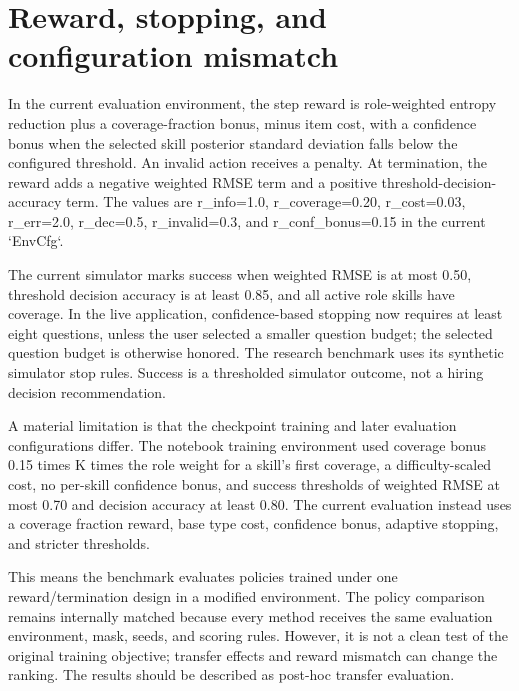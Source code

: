 \documentclass{ieeeaccess}
\begin{document}
\section{Reward, stopping, and configuration mismatch}

In the current evaluation environment, the step reward is role-weighted entropy reduction plus a coverage-fraction bonus, minus item cost, with a confidence bonus when the selected skill posterior standard deviation falls below the configured threshold. An invalid action receives a penalty. At termination, the reward adds a negative weighted RMSE term and a positive threshold-decision-accuracy term. The values are r\_info=1.0, r\_coverage=0.20, r\_cost=0.03, r\_err=2.0, r\_dec=0.5, r\_invalid=0.3, and r\_conf\_bonus=0.15 in the current `EnvCfg`.

The current simulator marks success when weighted RMSE is at most 0.50, threshold decision accuracy is at least 0.85, and all active role skills have coverage. In the live application, confidence-based stopping now requires at least eight questions, unless the user selected a smaller question budget; the selected question budget is otherwise honored. The research benchmark uses its synthetic simulator stop rules. Success is a thresholded simulator outcome, not a hiring decision recommendation.

A material limitation is that the checkpoint training and later evaluation configurations differ. The notebook training environment used coverage bonus 0.15 times K times the role weight for a skill's first coverage, a difficulty-scaled cost, no per-skill confidence bonus, and success thresholds of weighted RMSE at most 0.70 and decision accuracy at least 0.80. The current evaluation instead uses a coverage fraction reward, base type cost, confidence bonus, adaptive stopping, and stricter thresholds.

This means the benchmark evaluates policies trained under one reward/termination design in a modified environment. The policy comparison remains internally matched because every method receives the same evaluation environment, mask, seeds, and scoring rules. However, it is not a clean test of the original training objective; transfer effects and reward mismatch can change the ranking. The results should be described as post-hoc transfer evaluation.
\end{document}
